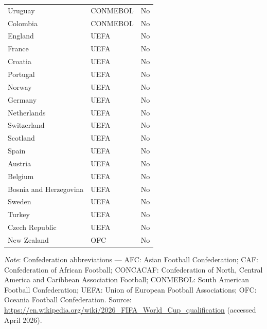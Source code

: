 \documentclass[12pt]{article}
\begin{document}
\begin{longtable}{llc}
Uruguay        & CONMEBOL & No \\
Colombia       & CONMEBOL & No \\
England        & UEFA & No \\
France         & UEFA & No \\
Croatia        & UEFA & No \\
Portugal       & UEFA & No \\
Norway         & UEFA & No \\
Germany        & UEFA & No \\
Netherlands    & UEFA & No \\
Switzerland    & UEFA & No \\
Scotland       & UEFA & No \\
Spain          & UEFA & No \\
Austria        & UEFA & No \\
Belgium        & UEFA & No \\
Bosnia and Herzegovina & UEFA & No \\
Sweden         & UEFA & No \\
Turkey         & UEFA & No \\
Czech Republic & UEFA & No \\
New Zealand    & OFC & No \\
\end{longtable}

\noindent\small
\textit{Note}: Confederation abbreviations --- AFC: Asian Football
Confederation; CAF: Confederation of African Football; CONCACAF:
Confederation of North, Central America and Caribbean Association
Football; CONMEBOL: South American Football Confederation; UEFA:
Union of European Football Associations; OFC: Oceania Football
Confederation. Source: \url{https://en.wikipedia.org/wiki/2026_FIFA_World_Cup_qualification}
(accessed April 2026).



\end{document}
